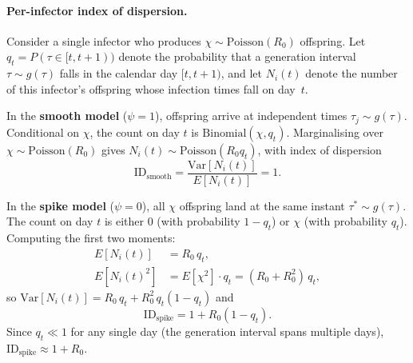 \paragraph{Per-infector index of dispersion.} Consider a single infector who produces $\chi \sim \text{Poisson}(R_0)$ offspring. Let $q_t = P(\tau \in [t, t+1))$ denote the probability that a generation interval $\tau \sim g(\tau)$ falls in the calendar day $[t, t+1)$, and let $N_i(t)$ denote the number of this infector's offspring whose infection times fall on day~$t$.

In the \textbf{smooth model} ($\psi = 1$), offspring arrive at independent times $\tau_j \sim g(\tau)$. Conditional on $\chi$, the count on day $t$ is $\text{Binomial}(\chi, q_t)$. Marginalising over $\chi \sim \text{Poisson}(R_0)$ gives $N_i(t) \sim \text{Poisson}(R_0 q_t)$, with index of dispersion
%
\begin{equation}
	\text{ID}_{\text{smooth}} = \frac{\text{Var}[N_i(t)]}{E[N_i(t)]} = 1.
\end{equation}

In the \textbf{spike model} ($\psi = 0$), all $\chi$ offspring land at the same instant $\tau^* \sim g(\tau)$. The count on day $t$ is either $0$ (with probability $1 - q_t$) or $\chi$ (with probability $q_t$). Computing the first two moments:
%
\begin{align}
	E[N_i(t)] &= R_0 \, q_t, \\[4pt]
	E[N_i(t)^2] &= E[\chi^2] \cdot q_t = (R_0 + R_0^2) \, q_t,
\end{align}
%
so $\text{Var}[N_i(t)] = R_0 \, q_t + R_0^2 \, q_t(1 - q_t)$ and
%
\begin{equation}
	\text{ID}_{\text{spike}} = 1 + R_0(1 - q_t).
	\label{eq:id_spike}
\end{equation}
%
Since $q_t \ll 1$ for any single day (the generation interval spans multiple days), $\text{ID}_{\text{spike}} \approx 1 + R_0$.

